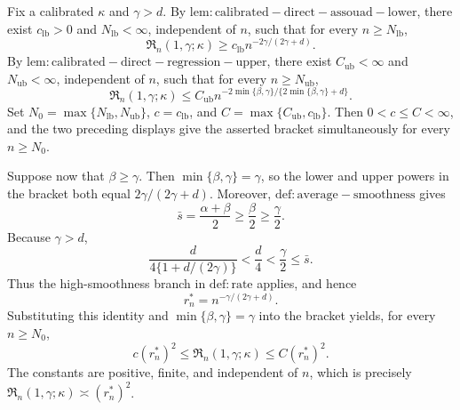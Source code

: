 Fix a calibrated \(\kappa\) and \(\gamma>d\). By \(\mathrm{lem:calibrated-direct-assouad-lower}\), there exist \(c_{\mathrm{lb}}>0\) and \(N_{\mathrm{lb}}<\infty\), independent of \(n\), such that for every \(n\ge N_{\mathrm{lb}}\),
\[
\mathfrak R_n(1,\gamma;\kappa)\ge c_{\mathrm{lb}}n^{-2\gamma/(2\gamma+d)}.
\]
By \(\mathrm{lem:calibrated-direct-regression-upper}\), there exist \(C_{\mathrm{ub}}<\infty\) and \(N_{\mathrm{ub}}<\infty\), independent of \(n\), such that for every \(n\ge N_{\mathrm{ub}}\),
\[
\mathfrak R_n(1,\gamma;\kappa)
\le C_{\mathrm{ub}}n^{-2\min\{\beta,\gamma\}/\{2\min\{\beta,\gamma\}+d\}}.
\]
Set \(N_0=\max\{N_{\mathrm{lb}},N_{\mathrm{ub}}\}\), \(c=c_{\mathrm{lb}}\), and \(C=\max\{C_{\mathrm{ub}},c_{\mathrm{lb}}\}\). Then \(0<c\le C<\infty\), and the two preceding displays give the asserted bracket simultaneously for every \(n\ge N_0\).

Suppose now that \(\beta\ge\gamma\). Then \(\min\{\beta,\gamma\}=\gamma\), so the lower and upper powers in the bracket both equal \(2\gamma/(2\gamma+d)\). Moreover, \(\mathrm{def:average-smoothness}\) gives
\[
\bar s=\frac{\alpha+\beta}{2}\ge\frac{\beta}{2}\ge\frac{\gamma}{2}.
\]
Because \(\gamma>d\),
\[
\frac{d}{4\{1+d/(2\gamma)\}}<\frac d4<\frac\gamma2\le\bar s.
\]
Thus the high-smoothness branch in \(\mathrm{def:rate}\) applies, and hence
\[
r_n^*=n^{-\gamma/(2\gamma+d)}.
\]
Substituting this identity and \(\min\{\beta,\gamma\}=\gamma\) into the bracket yields, for every \(n\ge N_0\),
\[
c(r_n^*)^2
\le\mathfrak R_n(1,\gamma;\kappa)
\le C(r_n^*)^2.
\]
The constants are positive, finite, and independent of \(n\), which is precisely \(\mathfrak R_n(1,\gamma;\kappa)\asymp(r_n^*)^2\).